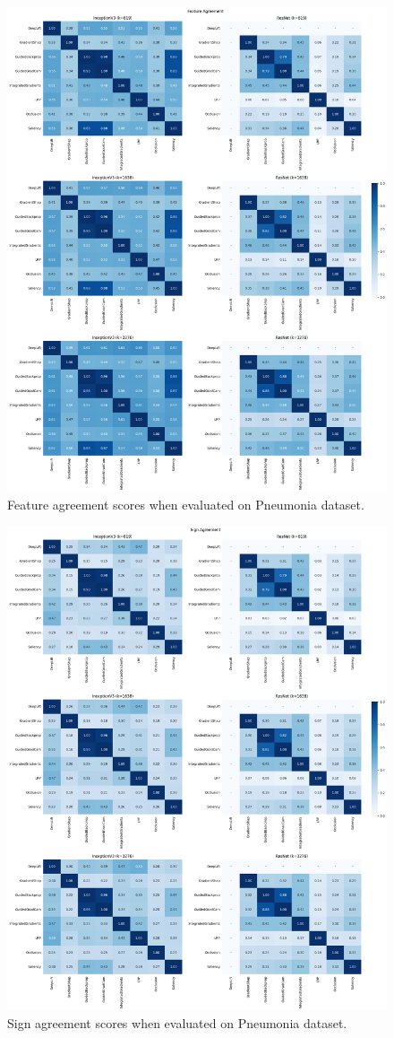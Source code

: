 \begin{figure}[t]
    \centering
    \includegraphics[width=\textwidth]{images/results/pneumonia/fa.png}
    \caption{Feature agreement scores when evaluated on Pneumonia dataset.}
    \label{fig:pneumonia_fa}
\end{figure}

\begin{figure}[t]
    \centering
    \includegraphics[width=\textwidth]{images/results/pneumonia/sa.png}
    \caption{Sign agreement scores when evaluated on Pneumonia dataset.}
    \label{fig:pneumonia_sa}
\end{figure}